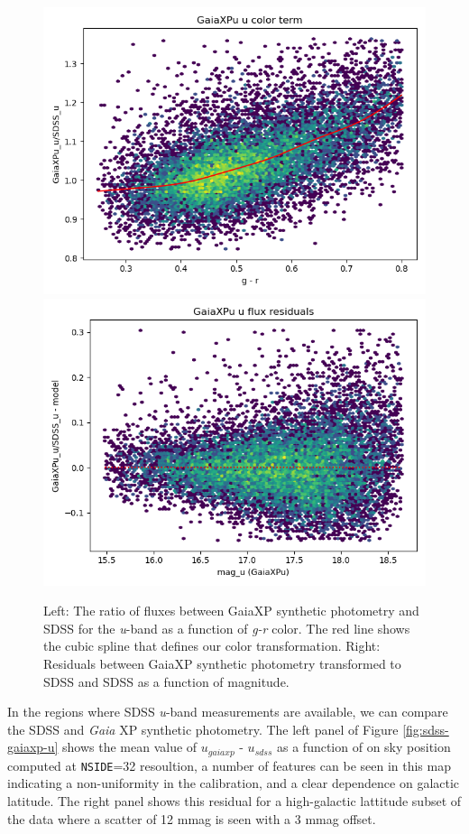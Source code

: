 \begin{figure}
    \includegraphics[width=0.49\linewidth]{./figures/color_terms/GaiaXPu_to_SDSS_band_u_color_term.png}
    \includegraphics[width=0.49\linewidth]{./figures/color_terms/GaiaXPu_to_SDSS_band_u_flux_residuals.png}
    \caption{Left: The ratio of fluxes between GaiaXP synthetic photometry and SDSS for the \textit{u}-band as a function of \textit{g-r} color. The red line shows the cubic spline that defines our color transformation.
    Right: Residuals between GaiaXP synthetic photometry transformed to SDSS and SDSS as a function of magnitude.}
    \label{fig:color-gaiaxp-usdss-u}
\end{figure}


In the regions where SDSS \textit{u}-band measurements are available, we can compare the SDSS and \emph{Gaia} XP synthetic photometry.
The left panel of Figure \ref{fig:sdss-gaiaxp-u} shows the mean value of $u_{gaiaxp}$ - $u_{sdss}$ as a function of on sky position computed at \texttt{NSIDE}=32 resoultion, a number of features can be seen in this map indicating a non-uniformity in the calibration, and a clear dependence on galactic latitude.
The right panel shows this residual for a high-galactic lattitude subset of the data where a scatter of 12 mmag is seen with a 3 mmag offset.

